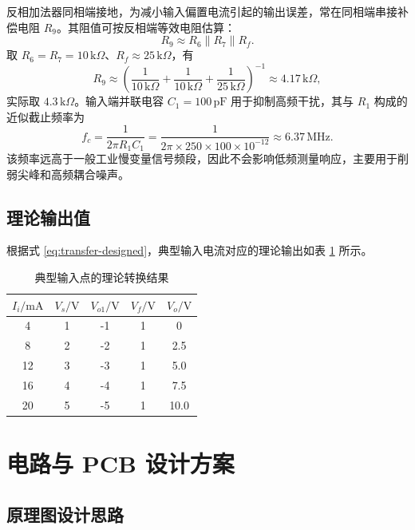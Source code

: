 \documentclass[UTF8,a4paper,zihao=-4]{ctexart}
\begin{document}
反相加法器同相端接地，为减小输入偏置电流引起的输出误差，常在同相端串接补偿电阻 $R_9$。其阻值可按反相端等效电阻估算：
\begin{equation}
  R_9 \approx R_6 \parallel R_7 \parallel R_f .
  \label{eq:r9}
\end{equation}
取 $R_6=R_7=10\,\mathrm{k}\Omega$、$R_f\approx25\,\mathrm{k}\Omega$，有
\begin{equation}
  R_9\approx
  \left(\frac{1}{10\,\mathrm{k}\Omega}
  +\frac{1}{10\,\mathrm{k}\Omega}
  +\frac{1}{25\,\mathrm{k}\Omega}\right)^{-1}
  \approx4.17\,\mathrm{k}\Omega ,
\end{equation}
实际取 $4.3\,\mathrm{k}\Omega$。输入端并联电容 $C_1=100\,\mathrm{pF}$ 用于抑制高频干扰，其与 $R_1$ 构成的近似截止频率为
\begin{equation}
  f_c=\frac{1}{2\pi R_1C_1}
  =\frac{1}{2\pi\times250\times100\times10^{-12}}
  \approx6.37\,\mathrm{MHz}.
\end{equation}
该频率远高于一般工业慢变量信号频段，因此不会影响低频测量响应，主要用于削弱尖峰和高频耦合噪声。

\subsection{理论输出值}

根据式 \eqref{eq:transfer-designed}，典型输入电流对应的理论输出如表 \ref{tab:theoretical-output} 所示。
\begin{table}[H]
  \centering
  \caption{典型输入点的理论转换结果}
  \label{tab:theoretical-output}
  \begin{tabular}{ccccc}
    \toprule
    $I_i/\mathrm{mA}$ & $V_s/\mathrm{V}$ & $V_{o1}/\mathrm{V}$ & $V_f/\mathrm{V}$ & $V_o/\mathrm{V}$ \\
    \midrule
    4  & 1 & -1 & 1 & 0 \\
    8  & 2 & -2 & 1 & 2.5 \\
    12 & 3 & -3 & 1 & 5.0 \\
    16 & 4 & -4 & 1 & 7.5 \\
    20 & 5 & -5 & 1 & 10.0 \\
    \bottomrule
  \end{tabular}
\end{table}

\section{电路与 PCB 设计方案}

\subsection{原理图设计思路}
\end{document}
